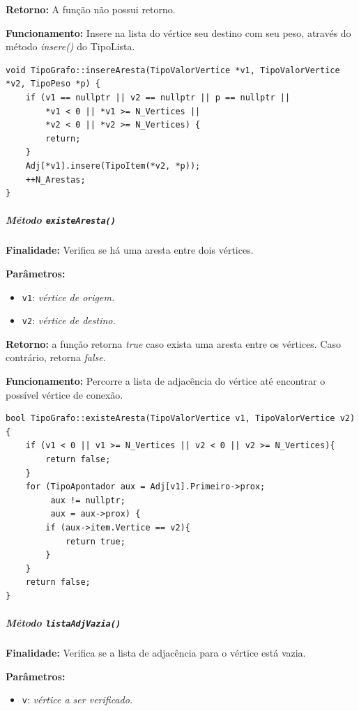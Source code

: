 \documentclass{article}
\begin{document}
    \textbf{Retorno:} A função não possui retorno.

    \textbf{Funcionamento:} Insere na lista do vértice seu destino com seu peso, através do método \textit{insere()} do TipoLista.

\begin{verbatim}
void TipoGrafo::insereAresta(TipoValorVertice *v1, TipoValorVertice *v2, TipoPeso *p) {
    if (v1 == nullptr || v2 == nullptr || p == nullptr ||
        *v1 < 0 || *v1 >= N_Vertices ||
        *v2 < 0 || *v2 >= N_Vertices) {
        return;
    }
    Adj[*v1].insere(TipoItem(*v2, *p));
    ++N_Arestas;
}
\end{verbatim}

\subparagraph{Método \texttt{existeAresta()}}

    \mbox{}\par
    \noindent
    \textbf{Finalidade:} Verifica se há uma aresta entre dois vértices.

    \textbf{Parâmetros:}
    \begin{itemize}
        \item \texttt{v1}: \textit{vértice de origem.}
        \item \texttt{v2}: \textit{vértice de destino.}
    \end{itemize}

    \textbf{Retorno:} a função retorna \textit{true} caso exista uma aresta entre os vértices. Caso contrário, retorna \textit{false}.

    \textbf{Funcionamento:} Percorre a lista de adjacência do vértice até encontrar o possível vértice de conexão.


\begin{verbatim}
bool TipoGrafo::existeAresta(TipoValorVertice v1, TipoValorVertice v2){
    if (v1 < 0 || v1 >= N_Vertices || v2 < 0 || v2 >= N_Vertices){
        return false;
    }
    for (TipoApontador aux = Adj[v1].Primeiro->prox;
         aux != nullptr;
         aux = aux->prox) {
        if (aux->item.Vertice == v2){
            return true;
        }
    }
    return false;
}
\end{verbatim}

\subparagraph{Método \texttt{listaAdjVazia()}}

    \mbox{}\par
    \noindent
    \textbf{Finalidade:} Verifica se a lista de adjacência para o vértice está vazia.

    \textbf{Parâmetros:}
    \begin{itemize}
       \item \texttt{v}: \textit{vértice a ser verificado.}
    \end{itemize}
\end{document}
